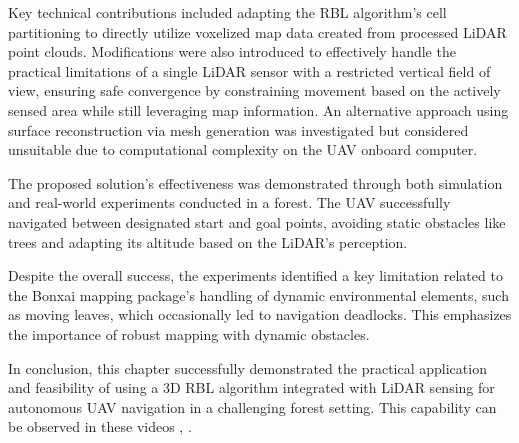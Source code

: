         Key technical contributions included adapting the \ac{RBL} algorithm's cell partitioning to directly utilize voxelized map data created from processed \ac{LiDAR} point clouds. 
        Modifications were also introduced to effectively handle the practical limitations of a single \ac{LiDAR} sensor with a restricted vertical field of view, ensuring safe convergence by constraining movement based on the actively sensed area while still leveraging map information. 
        An alternative approach using surface reconstruction via mesh generation was investigated but considered unsuitable due to computational complexity on the \ac{UAV} onboard computer.

        The proposed solution's effectiveness was demonstrated through both simulation and real-world experiments conducted in a forest. 
        The \ac{UAV} successfully navigated between designated start and goal points, avoiding static obstacles like trees and adapting its altitude based on the \ac{LiDAR}'s perception. 

        Despite the overall success, the experiments identified a key limitation related to the Bonxai mapping package's handling of dynamic environmental elements, such as moving leaves, which occasionally led to navigation deadlocks. 
        This emphasizes the importance of robust mapping with dynamic obstacles.

        In conclusion, this chapter successfully demonstrated the practical application and feasibility of using a 3D \ac{RBL} algorithm integrated with \ac{LiDAR} sensing for autonomous \ac{UAV} navigation in a challenging forest setting. 
        This capability can be observed in these videos \cite{aggressive_flight}, \cite{conservative_flight}.



